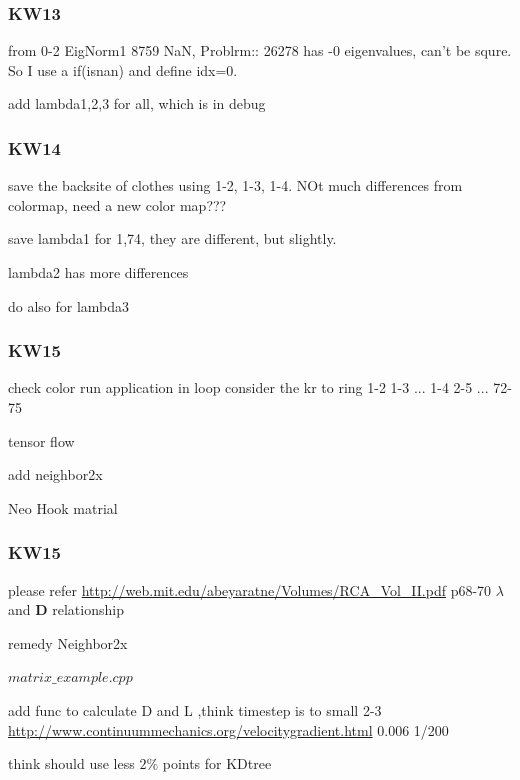 \documentclass{beamer}
\begin{document}
\begin{frame}
\frametitle{KW13}


from 0-2 EigNorm1 8759 NaN, Problrm:: 26278 has -0 eigenvalues, can't be squre. So I use a if(isnan) and define idx=0.

add lambda1,2,3 for all, which is in debug
\end{frame}


\begin{frame}
\frametitle{KW14}
save the backsite of clothes using 1-2, 1-3, 1-4. NOt much differences from colormap, need a new color map??? 

save lambda1 for 1,74, they are different, but slightly.

lambda2 has more differences

do also for lambda3
\end{frame}


\begin{frame}
\frametitle{KW15}
check color  
run application in loop
consider the kr to ring
1-2 1-3 ...
1-4 2-5 ... 72-75

tensor flow

add neighbor2x


Neo Hook matrial
\end{frame}


\begin{frame}
\frametitle{KW15}
please refer
\url{http://web.mit.edu/abeyaratne/Volumes/RCA_Vol_II.pdf} p68-70 $\lambda$ and $\mathbf{D}$ relationship

remedy Neighbor2x

\end{frame}


\begin{frame}
$matrix\_example.cpp$

add func to calculate D and L ,think timestep is to small 2-3
\url{http://www.continuummechanics.org/velocitygradient.html}
0.006
1/200

think should use less $2\%$ points for KDtree

\end{frame}
\end{document}
